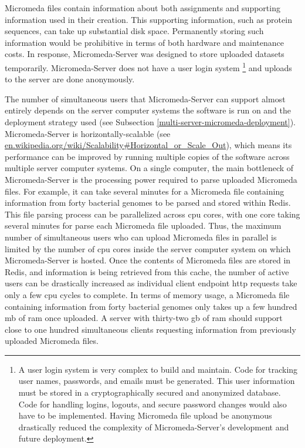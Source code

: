 Micromeda files contain information about both assignments and supporting 
information used in their creation. This supporting information, such as protein 
sequences, can take up substantial disk space. Permanently storing such 
information would be prohibitive in terms of both hardware and maintenance 
costs. In response, Micromeda-Server was designed to store uploaded datasets 
temporarily. Micromeda-Server does not have a user login system \footnote{A user 
login system is very complex to build and maintain. Code for tracking user 
names, passwords, and emails must be generated. This user information must be 
stored in a cryptographically secured and anonymized database. Code for handling 
logins, logouts, and secure password changes would also have to be implemented. 
Having Micromeda file upload be anonymous drastically reduced the complexity of 
Micromeda-Server's development and future deployment.} and uploads to the server 
are done anonymously.

The number of simultaneous users that Micromeda-Server can support almost entirely depends on the server computer systems the software is run on and the deployment strategy used (see Subsection \ref{multi-server-micromeda-deployment}).
Micromeda-Server is horizontally-scalable (see \href{https://en.wikipedia.org/wiki/Scalability#Horizontal_or_Scale_Out}{en.wikipedia.org/wiki/Scalability\#Horizontal\_or\_Scale\_Out}), which means its performance can be 
improved by running multiple copies of the software across multiple server computer systems. On 
a single computer, the main bottleneck of Micromeda-Server is the processing 
power required to parse uploaded Micromeda files. For example, it can take 
several minutes for a Micromeda file containing information from forty bacterial 
genomes to be parsed and stored within Redis. This file parsing process can be 
parallelized across \gls{cpu} cores, with one core taking several minutes for 
parse each Micromeda file uploaded. Thus, the maximum number of simultaneous 
users who can upload Micromeda files in parallel is limited by the number of 
\gls{cpu} cores inside the server computer system on which Micromeda-Server is 
hosted. Once the contents of Micromeda files are stored in Redis, and 
information is being retrieved from this cache, the number of active users can 
be drastically increased as individual client endpoint \gls{http} requests take 
only a few \gls{cpu} cycles to complete. In terms of memory usage, a Micromeda 
file containing information from forty bacterial genomes only takes up a few 
hundred \gls{mb} of \gls{ram} once uploaded. A server with thirty-two \gls{gb} 
of \gls{ram} should support close to one hundred simultaneous clients requesting 
information from previously uploaded Micromeda files.

